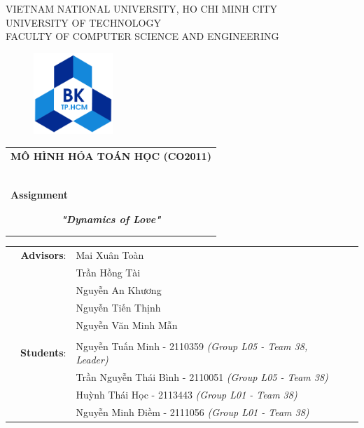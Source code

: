 \documentclass[a4paper]{article}
\begin{document}
\begin{titlepage}
\begin{center}
VIETNAM NATIONAL UNIVERSITY, HO CHI MINH CITY \\
UNIVERSITY OF TECHNOLOGY \\
FACULTY OF COMPUTER SCIENCE AND ENGINEERING
\end{center}

\vspace{1cm}

\begin{figure}[h!]
\begin{center}
\includegraphics[width=3cm]{hcmut.png}
\end{center}
\end{figure}

\vspace{1cm}


\begin{center}
\begin{tabular}{c}
\multicolumn{1}{l}{\textbf{{\Large MÔ HÌNH HÓA TOÁN HỌC (CO2011)}}}\\
~~\\
\hline
\\
\multicolumn{1}{l}{\textbf{{\Large Assignment}}}\\
\\
\\
\textbf{\textit{{\Huge "Dynamics of Love"}}}\\
\\
\\
\hline
\end{tabular}
\end{center}

\vspace{2cm}

\begin{table}[h]
\begin{tabular}{rrlrr}
\hspace{3 cm} & \textbf{Advisors}: & Mai Xuân Toàn&\\
& & Trần Hồng Tài&\\
& & Nguyễn An Khương& \\
& & Nguyễn Tiến Thịnh& \\
& & Nguyễn Văn Minh Mẫn& \\
& & & & \\
& \textbf{Students}: & Nguyễn Tuấn Minh  - 2110359 \textit{(Group L05 - Team 38, Leader)} \\
& & Trần Nguyễn Thái Bình - 2110051 \textit{(Group L05 - Team 38)}\\
& & Huỳnh Thái Học - 2113443 \textit{(Group L01 - Team 38)} \\
& & Nguyễn Minh Điềm - 2111056 \textit{(Group L01 - Team 38)} \\
\end{tabular}
\end{table}


\end{titlepage}
\end{document}
